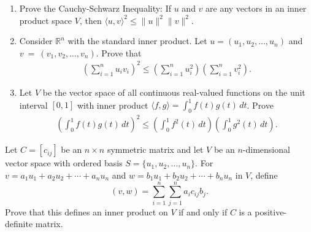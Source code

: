 \documentclass[12pt]{article}
\theoremstyle{remark}
\newtheorem*{solution}{Solution}
\newcommand{\R}{\mathbb{R}}
\renewcommand{\=}{&=&}
\newcommand{\<}{\langle}
\renewcommand{\>}{\rangle}
\newcommand{\beq}{\begin{eqnarray*}}
\newcommand{\eeq}{\end{eqnarray*}}
\begin{document}
\begin{problems}
\begin{enumerate}
\end{enumerate}



\item
\begin{enumerate}
	\item Prove the Cauchy-Schwarz Inequality: If $u$ and $v$ are any vectors in an inner 
	product space $V$, then $\langle u, v \rangle^2 \le \|u\|^2 \|v\|^2$.
	
	
	\item Consider $\R^n$ with the standard inner product. Let
	$u = (u_1, u_2, \ldots, u_n)$ and $v~=~(v_1, v_2, \ldots, v_n)$. Prove that 
	\beq
		\left(\sum_{i=1}^n u_i v_i \right)^2 \le \left(\sum_{i=1}^n u_i^2 \right)
		\left(\sum_{i=1}^n v_i^2 \right).
	\eeq
	
	
	\item Let $V$ be the vector space of all continuous real-valued functions on the
	unit interval $[0,1]$ with inner product $\<f,g\> = \int_0^1 f(t) g(t) \, dt$. Prove
	\beq
		\left(\int_0^1 f(t) g(t) \, dt \right)^2 \le \left(\int_0^1 f^2(t) \, dt \right)
		\left(\int_0^1 g^2(t) \, dt \right).
	\eeq
	
\end{enumerate}



\item
Let $C = [c_{ij}]$ be an $n \times n$ symmetric matrix and let $V$ be an $n$-dimensional
vector space with ordered basis $S = \{u_1, u_2, \ldots, u_n\}$. For $v = a_1 u_1 + a_2 u_2
+ \cdots + a_n u_n$ and $w = b_1 u_1 + b_2 u_2 + \cdots + b_n u_n$ in $V$, define
$$(v,w) = \sum_{i=1}^n \sum_{j=1}^n a_i c_{ij} b_j.$$ Prove that this defines an inner
product on $V$ if and only if $C$ is a positive-definite matrix.


\end{problems}
\end{document}
